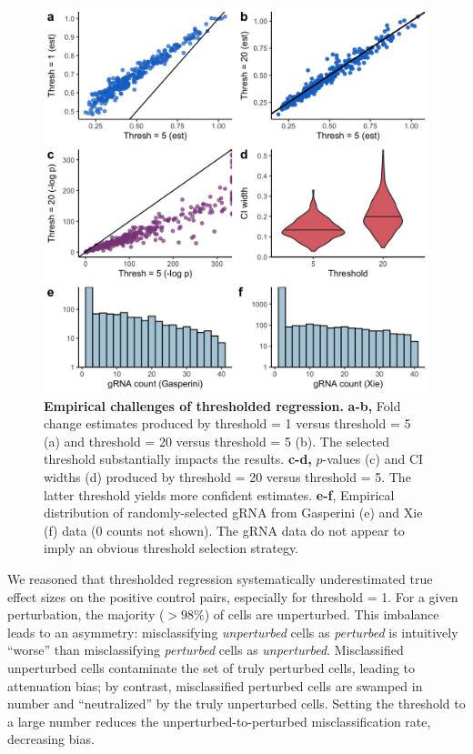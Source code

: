 \documentclass[12pt]{article}
\begin{document}
\begin{figure}[h!]
	\centering
	\includegraphics[width=1\linewidth]{figures/thresholding_empirical.jpeg}
	\caption{\textbf{Empirical challenges of thresholded regression.} \textbf{a-b,} Fold change estimates produced by threshold = 1 versus threshold = 5 (a) and threshold = 20 versus threshold = 5 (b). The selected threshold substantially impacts the results. \textbf{c-d,} $p$-values (c) and CI widths (d) produced by threshold = 20 versus threshold = 5. The latter threshold yields more confident estimates. \textbf{e-f}, Empirical distribution of randomly-selected gRNA from Gasperini (e) and Xie (f) data (0 counts not shown). The gRNA data do not appear to imply an obvious threshold selection strategy.}
	\label{thresholding_empirical}
\end{figure}

We reasoned that thresholded regression systematically underestimated true effect sizes on the positive control pairs, especially for threshold = 1. For a given perturbation, the majority ($>98\%$) of cells are unperturbed. This imbalance leads to an asymmetry: misclassifying \textit{unperturbed} cells as \textit{perturbed} is intuitively ``worse'' than misclassifying \textit{perturbed} cells as \textit{unperturbed}. Misclassified unperturbed cells contaminate the set of truly perturbed cells, leading to attenuation bias; by contrast, misclassified perturbed cells are swamped in number and ``neutralized'' by the truly unperturbed cells. Setting the threshold to a large number reduces the unperturbed-to-perturbed misclassification rate, decreasing bias.
\end{document}
